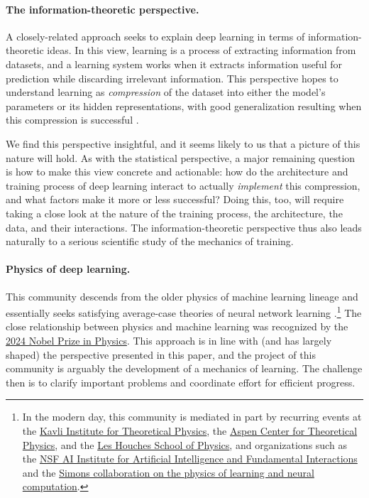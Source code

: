 \paragraph{The information-theoretic perspective.}
A closely-related approach seeks to explain deep learning in terms of information-theoretic ideas.
In this view, learning is a process of extracting information from datasets, and a learning system works when it extracts information useful for prediction while discarding irrelevant information.
This perspective hopes to understand learning as \textit{compression} of the dataset into either the model's parameters or its hidden representations, with good generalization resulting when this compression is successful \citep{shwartz2017opening,xu2017information}.

We find this perspective insightful, and it seems likely to us that a picture of this nature will hold.
As with the statistical perspective, a major remaining question is how to make this view concrete and actionable: how do the architecture and training process of deep learning interact to actually \textit{implement} this compression, and what factors make it more or less successful?
Doing this, too, will require taking a close look at the nature of the training process, the architecture, the data, and their interactions.
The information-theoretic perspective thus also leads naturally to a serious scientific study of the mechanics of training.

\paragraph{Physics of deep learning.}
This community descends from the older physics of machine learning lineage \citep{hopfield1982neural,amit1985spin,gardner1988space} and essentially seeks satisfying average-case theories of neural network learning \citep{zdeborova2020understanding,bahri2020statistical,michaudphysics,ringel2025applications}.\footnote{In the modern day, this community is mediated in part by recurring events at the \href{https://www.kitp.ucsb.edu/activities/deeplearning23}{Kavli Institute for Theoretical Physics}, the \href{https://aspenphys.org/event/theoretical-physics-for-artificial-intelligence}{Aspen Center for Theoretical Physics}, and the \href{https://leshouches2022.github.io/}{Les Houches School of Physics}, and organizations such as the \href{https://iaifi.org/}{NSF AI Institute for Artificial Intelligence and Fundamental Interactions} and the \href{https://www.physicsoflearning.org/}{Simons collaboration on the physics of learning and neural computation}.}
The close relationship between physics and machine learning was recognized by the \href{https://www.nobelprize.org/prizes/physics/2024/summary/}{2024 Nobel Prize in Physics}.
This approach is in line with (and has largely shaped) the perspective presented in this paper, and the project of this community is arguably the development of a mechanics of learning.
The challenge then is to clarify important problems and coordinate effort for efficient progress.

